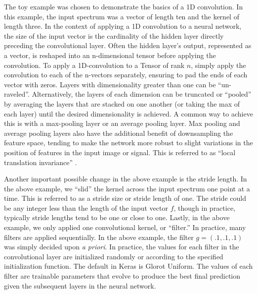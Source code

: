 The toy example was chosen to demonstrate the basics of a 1D convolution. In this example, the input spectrum was a vector of length ten and the kernel of length three. In the context of applying a 1D convolution to a neural network, the size of the input vector is the cardinality of the hidden layer directly preceding the convolutional layer. Often the hidden layer's output, represented as a vector, is reshaped into an n-dimensional tensor before applying the convolution. To apply a 1D-convolution to a Tensor of rank $ n $, simply apply the convolution to each of the n-vectors separately, ensuring to pad the ends of each vector with zeros. Layers with dimensionality greater than one can be ``un-raveled''. Alternatively, the layers of each dimension can be truncated or ``pooled'' by averaging the layers that are stacked on one another (or taking the max of each layer) until the desired dimensionality is achieved. A common way to achieve this is with a max-pooling layer or an average pooling layer. Max pooling and average pooling layers also have the additional benefit of downsampling the feature space, tending to make the network more robust to slight variations in the position of features in the input image or signal. This is referred to as ``local translation invariance'' \cite{local-translation-invariance}.

Another important possible change in the above example is the stride length. In the above example, we ``slid'' the kernel across the input spectrum one point at a time. This is referred to as a stride size or stride length of one. The stride could be any integer less than the length of the input vector $ f $, though in practice, typically stride lengths tend to be one or close to one. Lastly, in the above example, we only applied one convolutional kernel, or ``filter.'' In practice, many filters are applied sequentially. In the above example, the filter $ g = (.1, .1, .1) $ was simply decided upon \textit{a priori}. In practice, the values for each filter in the convolutional layer are initialized randomly or according to the specified initialization function. The default in Keras is Glorot Uniform. The values of each filter are trainable parameters that evolve to produce the best final prediction given the subsequent layers in the neural network.



